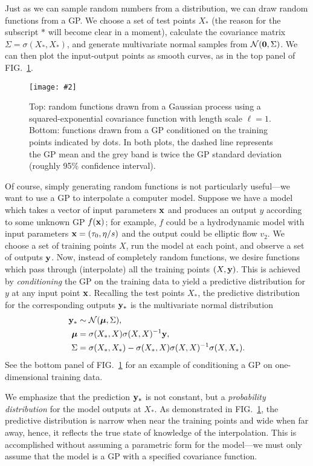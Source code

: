 \documentclass[aps,prc,reprint,superscriptaddress,amsmath]{revtex4-1}
\newcommand{\colfig}[3][t]{
  \begin{figure}[#1]
    \texttt{[image: \#2]}
    \caption{\label{fig:#2}#3}
  \end{figure}
}
\begin{document}
Just as we can sample random numbers from a distribution, we can draw random functions from a GP.
We choose a set of test points $X_*$ (the reason for the subscript $*$ will become clear in a moment), calculate the covariance matrix $\Sigma = \sigma(X_*, X_*)$, and generate multivariate normal samples from $\mathcal N(\mathbf 0, \Sigma)$.
We can then plot the input-output points as smooth curves, as in the top panel of FIG.~\ref{fig:gp}.

\colfig{gp}{
  Top: random functions drawn from a Gaussian process using a squared-exponential covariance function with length scale $\ell = 1$.
  Bottom: functions drawn from a GP conditioned on the training points indicated by dots.
  In both plots, the dashed line represents the GP mean and the grey band is twice the GP standard deviation (roughly 95\% confidence interval).
}

Of course, simply generating random functions is not particularly useful---we want to use a GP to interpolate a computer model.
Suppose we have a model which takes a vector of input parameters $\mathbf x$ and produces an output $y$ according to some unknown GP $f(\mathbf x)$; for example, $f$ could be a hydrodynamic model with input parameters $\mathbf x = (\tau_0, \eta/s)$ and the output could be elliptic flow $v_2$.
We choose a set of training points $X$, run the model at each point, and observe a set of outputs $\mathbf y$.
Now, instead of completely random functions, we desire functions which pass through (interpolate) all the training points $(X, \mathbf y)$.
This is achieved by \emph{conditioning} the GP on the training data to yield a predictive distribution for $y$ at any input point $\mathbf x$.
Recalling the test points $X_*$, the predictive distribution for the corresponding outputs $\mathbf y_*$ is the multivariate normal distribution
\begin{equation}
  \begin{aligned}
    \mathbf y_* &\sim \mathcal N(\boldsymbol\mu, \Sigma), \\
    \boldsymbol\mu &= \sigma(X_*, X)\sigma(X, X)^{-1}\mathbf y, \\
    \Sigma &= \sigma(X_*,X_*) - \sigma(X_*,X)\sigma(X,X)^{-1}\sigma(X,X_*).
  \end{aligned}
  \label{eq:cond}
\end{equation}
See the bottom panel of FIG.~\ref{fig:gp} for an example of conditioning a GP on one-dimensional training data.

We emphasize that the prediction $\mathbf y_*$ is not constant, but a \emph{probability distribution} for the model outputs at $X_*$.
As demonstrated in FIG.~\ref{fig:gp}, the predictive distribution is narrow when near the training points and wide when far away, hence, it reflects the true state of knowledge of the interpolation.
This is accomplished without assuming a parametric form for the model---we must only assume that the model is a GP with a specified covariance function.
\end{document}
